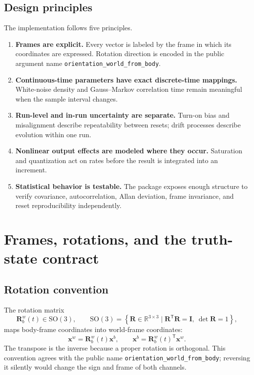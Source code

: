 \documentclass[11pt,oneside,headings=big]{scrreprt}
\newcommand{\Rwb}[1][]{\mathbf{R}^{w}_{b#1}}
\newcommand{\transpose}{\mathsf{T}}
\newcommand{\vect}[1]{\bm{#1}}
\newcommand{\mat}[1]{\bm{#1}}
\newcommand{\field}[1]{\texttt{#1}}
\begin{document}
    \section{Design principles}
    The implementation follows five principles.
    \begin{enumerate}
        \item \textbf{Frames are explicit.} Every vector is labeled by the frame in
        which its coordinates are expressed. Rotation direction is encoded in the
        public argument name \field{orientation\_world\_from\_body}.
        \item \textbf{Continuous-time parameters have exact discrete-time mappings.}
        White-noise density and Gauss--Markov correlation time remain meaningful when
        the sample interval changes.
        \item \textbf{Run-level and in-run uncertainty are separate.} Turn-on bias and
        misalignment describe repeatability between resets; drift processes describe
        evolution within one run.
        \item \textbf{Nonlinear output effects are modeled where they occur.}
        Saturation and quantization act on rates before the result is integrated into
        an increment.
        \item \textbf{Statistical behavior is testable.} The package exposes enough
        structure to verify covariance, autocorrelation, Allan deviation, frame
        invariance, and reset reproducibility independently.
    \end{enumerate}


    \chapter{Frames, rotations, and the truth-state contract}
    \label{chap:truth}


    \section{Rotation convention}
    The rotation matrix
    \begin{equation}
        \Rwb(t)\in\mathrm{SO}(3),
        \qquad
        \mathrm{SO}(3)=\left\{\mat R\in\mathbb{R}^{3\times3}
                           \mid \mat R^\transpose\mat R=\mat I,\ \det\mat R=1\right\},
    \end{equation}
    maps body-frame coordinates into world-frame coordinates:
    \begin{equation}
        \vect x^w = \Rwb(t)\vect x^b,
        \qquad
        \vect x^b = \Rwb(t)^\transpose\vect x^w.
        \label{eq:frame-map}
    \end{equation}
    The transpose is the inverse because a proper rotation is orthogonal. This
    convention agrees with the public name
    \field{orientation\_world\_from\_body}; reversing it silently would change the
    sign and frame of both channels.
\end{document}
